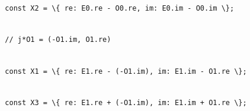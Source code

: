 \documentclass[
]{article}
\newcommand{\passthrough}[1]{#1}
\begin{document}
\passthrough{\lstinline!  !}\passthrough{\lstinline!const!}\passthrough{\lstinline! !}\passthrough{\lstinline!X2!}\passthrough{\lstinline! !}\passthrough{\lstinline!=!}\passthrough{\lstinline! !}\passthrough{\lstinline!\{!}\passthrough{\lstinline! !}\passthrough{\lstinline!re:!}\passthrough{\lstinline! !}\passthrough{\lstinline!E0.re!}\passthrough{\lstinline! !}\passthrough{\lstinline!-!}\passthrough{\lstinline! !}\passthrough{\lstinline!O0.re,!}\passthrough{\lstinline! !}\passthrough{\lstinline!im:!}\passthrough{\lstinline! !}\passthrough{\lstinline!E0.im!}\passthrough{\lstinline! !}\passthrough{\lstinline!-!}\passthrough{\lstinline! !}\passthrough{\lstinline!O0.im!}\passthrough{\lstinline! !}\passthrough{\lstinline!\};!}\strut \\
\passthrough{\lstinline!  !}\passthrough{\lstinline!//!}\passthrough{\lstinline! !}\passthrough{\lstinline!j*O1!}\passthrough{\lstinline! !}\passthrough{\lstinline!=!}\passthrough{\lstinline! !}\passthrough{\lstinline!(-O1.im,!}\passthrough{\lstinline! !}\passthrough{\lstinline!O1.re)!}\strut \\
\passthrough{\lstinline!  !}\passthrough{\lstinline!const!}\passthrough{\lstinline! !}\passthrough{\lstinline!X1!}\passthrough{\lstinline! !}\passthrough{\lstinline!=!}\passthrough{\lstinline! !}\passthrough{\lstinline!\{!}\passthrough{\lstinline! !}\passthrough{\lstinline!re:!}\passthrough{\lstinline! !}\passthrough{\lstinline!E1.re!}\passthrough{\lstinline! !}\passthrough{\lstinline!-!}\passthrough{\lstinline! !}\passthrough{\lstinline!(-O1.im),!}\passthrough{\lstinline! !}\passthrough{\lstinline!im:!}\passthrough{\lstinline! !}\passthrough{\lstinline!E1.im!}\passthrough{\lstinline! !}\passthrough{\lstinline!-!}\passthrough{\lstinline! !}\passthrough{\lstinline!O1.re!}\passthrough{\lstinline! !}\passthrough{\lstinline!\};!}\strut \\
\passthrough{\lstinline!  !}\passthrough{\lstinline!const!}\passthrough{\lstinline! !}\passthrough{\lstinline!X3!}\passthrough{\lstinline! !}\passthrough{\lstinline!=!}\passthrough{\lstinline! !}\passthrough{\lstinline!\{!}\passthrough{\lstinline! !}\passthrough{\lstinline!re:!}\passthrough{\lstinline! !}\passthrough{\lstinline!E1.re!}\passthrough{\lstinline! !}\passthrough{\lstinline!+!}\passthrough{\lstinline! !}\passthrough{\lstinline!(-O1.im),!}\passthrough{\lstinline! !}\passthrough{\lstinline!im:!}\passthrough{\lstinline! !}\passthrough{\lstinline!E1.im!}\passthrough{\lstinline! !}\passthrough{\lstinline!+!}\passthrough{\lstinline! !}\passthrough{\lstinline!O1.re!}\passthrough{\lstinline! !}\passthrough{\lstinline!\};!}\strut \\
\end{document}
